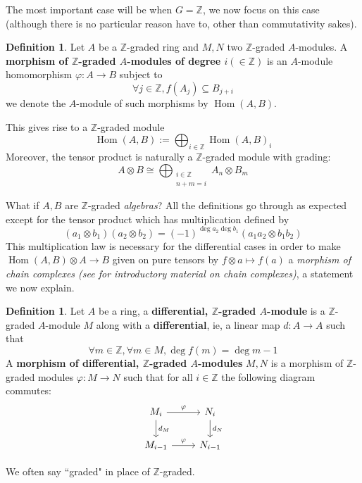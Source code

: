 \documentclass[12pt]{article}
\theoremstyle{plain}
\theoremstyle{definition}
\newtheorem{defn}[thm]{Definition} %
\newcommand{\bb}[1]{\mathbb{#1}}
\newcommand{\lto}{\longrightarrow}
\begin{document}
The most important case will be when $G = \bb{Z}$, we now focus on this case (although there is no particular reason have to, other than commutativity sakes).
\begin{defn}
Let $A$ be a $\bb{Z}$-graded ring and $M,N$ two $\bb{Z}$-graded $A$-modules. A \textbf{morphism of $\bb{Z}$-graded $A$-modules of degree $i (\in \bb{Z})$} is an $A$-module homomorphism $\varphi: A \lto B$ subject to
\begin{equation}
\forall j \in \bb{Z}, f(A_j) \subseteq B_{j + i}
\end{equation}
we denote the $A$-module of such morphisms by $\operatorname{Hom}(A,B)$.

This gives rise to a $\bb{Z}$-graded module
\begin{equation}
\operatorname{Hom}(A,B) := \bigoplus_{i \in \bb{Z}}\operatorname{Hom}(A,B)_i
\end{equation}
Moreover, the tensor product is naturally a $\bb{Z}$-graded module with grading:
\begin{equation}
A \otimes B \cong \bigoplus_{\substack{i \in \bb{Z}\\ n + m = i}}A_n \otimes B_m
\end{equation}
\end{defn}
What if $A,B$ are $\bb{Z}$-graded \emph{algebras}? All the definitions go through as expected except for the tensor product which has multiplication defined by
\begin{equation}\label{eq:tensor}
(a_1 \otimes b_1)(a_2 \otimes b_2) = (-1)^{\operatorname{deg}a_2\operatorname{deg}b_1}(a_1a_2 \otimes b_1b_2)
\end{equation}
This multiplication law is necessary for the differential cases in order to make $\operatorname{Hom}(A,B) \otimes A \lto B$ given on pure tensors by $f \otimes a \longmapsto f(a)$ a \emph{morphism of chain complexes (see \cite{intro_hom_alg} for introductory material on chain complexes)}, a statement we now explain.
\begin{defn}\label{def:diff_graded}
Let $A$ be a ring, a \textbf{differential, $\bb{Z}$-graded $A$-module} is a $\bb{Z}$-graded $A$-module $M$ along with a \textbf{differential}, ie, a linear map $d: A \lto A$ such that
\begin{equation}
\forall m \in \bb{Z}, \forall m \in M, \operatorname{deg}f(m) = \operatorname{deg}m - 1
\end{equation}
A \textbf{morphism of differential, $\bb{Z}$-graded $A$-modules} $M,N$ is a morphism of $\bb{Z}$-graded modules $\varphi: M \lto N$ such that for all $i \in \bb{Z}$
the following diagram commutes:
\begin{equation}
\begin{tikzcd}
M_i\arrow[r, "\varphi"]\arrow[d,"{d_M}"] & N_i\arrow[d,"{d_N}"]\\
M_{i - 1}\arrow[r,"{\varphi}"] & N_{i - 1}
\end{tikzcd}
\end{equation}
\end{defn}
We often say ``graded" in place of $\bb{Z}$-graded.
\end{document}
